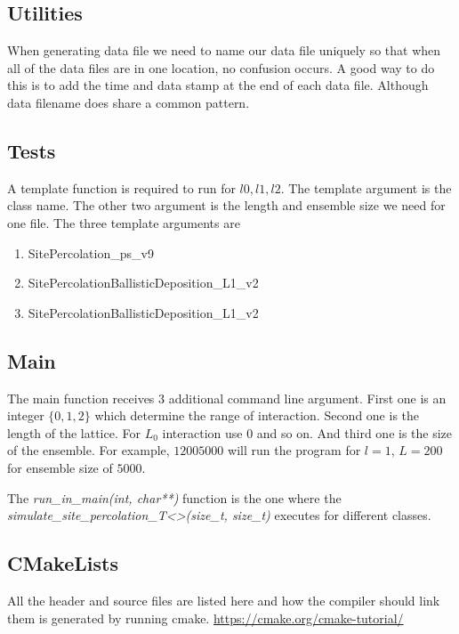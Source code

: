 	
%	
	
	\subsection{Utilities}
	When generating data file we need to name our data file uniquely so that when all of the data files are in one location, no confusion occurs. A good way to do this is to add the time and data stamp at the end of each data file. Although data filename does share a common pattern.
	
	\subsection{Tests}
	A template function is required to run for $l0, l1, l2$. The template argument is the class name. The other two argument is the length and ensemble size we need for one file. The three template arguments are
	\begin{enumerate}
		\item SitePercolation\_ps\_v9
		\item SitePercolationBallisticDeposition\_L1\_v2
		\item SitePercolationBallisticDeposition\_L1\_v2
	\end{enumerate}
	
	
	\subsection{Main}
	The main function receives 3 additional command line argument. First one is an integer $\{0,1,2\}$ which determine the range of interaction. Second one is the length of the lattice. For $L_0$ interaction use $0$ and so on. And third one is the size of the ensemble. For example, $1 200 5000$ will run the program for $l=1$, $L=200$ for ensemble size of $5000$.
	
	The \textit{run\_in\_main(int, char**)} function is the one where the  \textit{simulate\_site\_percolation\_T<>(size\_t, size\_t)} executes for different classes.
	
	
	
	\subsection{CMakeLists}
	All the header and source files are listed here and how the compiler should link them is generated by running cmake. \url{https://cmake.org/cmake-tutorial/}
	
